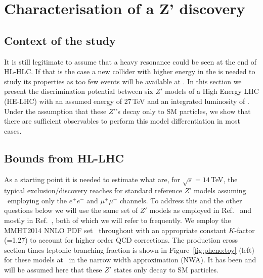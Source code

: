 \documentclass[a4paper,11pt]{article}
\begin{document}
\section{Characterisation of a Z' discovery}
\label{sec:zprimedisc}

\subsection{Context of the study}
It is still legitimate to assume that a heavy resonance could be seen at the end of HL-HLC. If that is the case a new collider with higher energy
in the \com is needed to study its properties as too few events will be available at \sqrtslhc. In this section we present the discrimination potential between six $Z'$ models of a High Energy LHC (HE-LHC) with an assumed \com energy of 27\,TeV and an integrated luminosity of \intlumihelhc. Under the assumption that these $Z'$'s decay only to SM particles, we show that there are sufficient observables to perform this model differentiation in most cases.

\subsection{Bounds from HL-LHC}
As a starting point it is needed to estimate what are, for $\sqrt s=14$\,TeV, the typical exclusion/discovery reaches for standard reference $Z'$ models assuming \intlumihllhc\ employing only the $e^+e^-$ and $\mu^+\mu^-$ channels. To address this and the other questions below we will use the same set of $Z'$ models as employed
in Ref.~\cite{Rizzo:2014xma} and mostly in Ref.~\cite{Han:2013mra}, both of which we will refer to frequently. We employ the MMHT2014 NNLO PDF set~\cite{Harland-Lang:2014zoa}
throughout with an appropriate constant $K$-factor (=1.27) to account for higher order QCD corrections. The production cross section times leptonic branching fraction is shown in Figure~\ref{fig:pheno:toy} (left) for these models at \sqrtslhc\ in the narrow width approximation (NWA). It has been and will be assumed here that these $Z'$ states only decay to SM particles.
\end{document}
